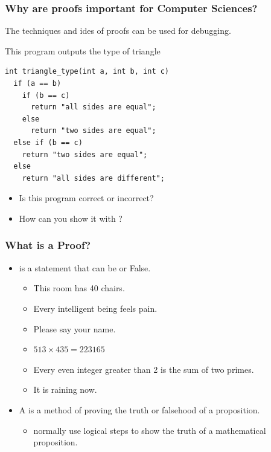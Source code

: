 \documentclass{beamer}
\begin{document}
\begin{frame}[fragile]
  \frametitle{Why are proofs important for Computer Sciences?}

  The techniques and ides of proofs can be used for \alert{debugging}.

  \begin{block}{This program outputs the type of triangle}
\begin{verbatim}
int triangle_type(int a, int b, int c)
  if (a == b)
    if (b == c)
      return "all sides are equal";
    else
      return "two sides are equal";
  else if (b == c)
    return "two sides are equal";
  else
    return "all sides are different";
\end{verbatim}
  \end{block}

  \begin{itemize}
  \item Is this program correct or incorrect?
  \item How can you show it with ?
  \end{itemize}
\end{frame}

\begin{frame}
  \frametitle{What is a Proof?}

  \begin{itemize}
  \item {} is a statement that can be
     or \alert{False}.
    \begin{itemize}
    \item This room has 40 chairs.
    \item Every intelligent being feels pain.
    \item Please say your name.
    \item $513 \times 435 = 223165$
    \item Every even integer greater than 2 is the sum of two primes.
    \item It is raining now.
    \end{itemize}

    \bigskip

  \item A  is a method of proving the truth or falsehood of a proposition.
    \begin{itemize}
    \item {} normally use logical steps
      to show the truth of a mathematical proposition.
    \end{itemize}
  \end{itemize}

\end{frame}
\end{document}
